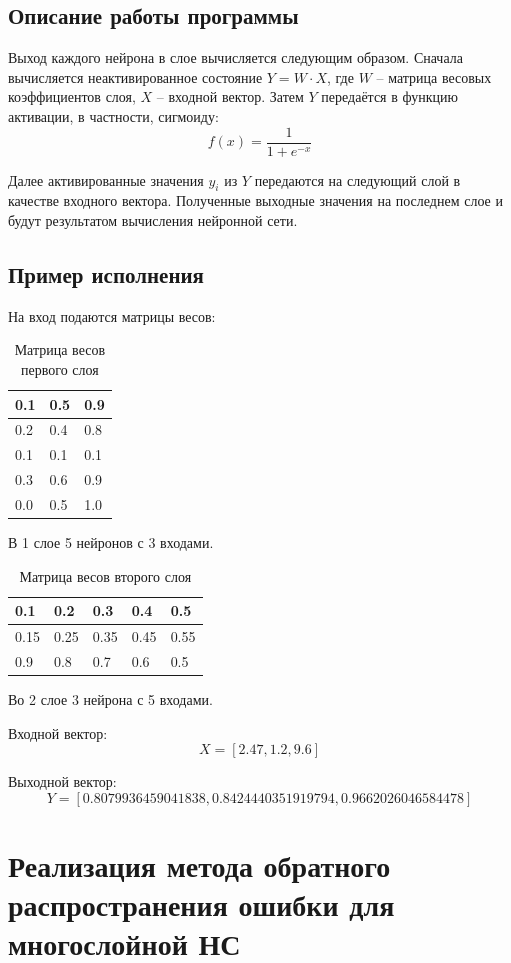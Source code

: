 \documentclass[bachelor, och, pract_otchet]{SCWorks}
\begin{document}
\subsection{Описание работы программы}
Выход каждого нейрона в слое вычисляется следующим образом.
Сначала вычисляется неактивированное состояние $Y = W \cdot X$, где
$W$ -- матрица весовых коэффициентов слоя,
$X$ -- входной вектор. Затем $Y$ передаётся в функцию активации,
в частности, сигмоиду:
\[ f(x) = \displaystyle\frac{1}{1 + e^{-x}} \]

Далее активированные значения $y_i$ из $Y$ передаются на следующий
слой в качестве входного вектора. Полученные выходные значения
на последнем слое и будут результатом вычисления нейронной сети.

\subsection{Пример исполнения}
На вход подаются матрицы весов:
\begin{table}[H]
  \begin{tabular}{|l|l|l|}
  \hline
  0.1 & 0.5 & 0.9 \\ \hline
  0.2 & 0.4 & 0.8 \\ \hline
  0.1 & 0.1 & 0.1 \\ \hline
  0.3 & 0.6 & 0.9 \\ \hline
  0.0 & 0.5 & 1.0 \\ \hline
  \end{tabular}
  \caption{Матрица весов первого слоя}
\end{table}
В 1 слое 5 нейронов с 3 входами.

\begin{table}[H]
  \begin{tabular}{|l|l|l|l|l|}
  \hline
  0.1 & 0.2 & 0.3 & 0.4 & 0.5 \\ \hline
  0.15 & 0.25 & 0.35 & 0.45 & 0.55 \\ \hline
  0.9 & 0.8 & 0.7 & 0.6 & 0.5 \\ \hline
  \end{tabular}
  \caption{Матрица весов второго слоя}
\end{table}
Во 2 слое 3 нейрона с 5 входами. 

Входной вектор:
\[ X = [2.47, 1.2, 9.6] \]

Выходной вектор:
\[ Y = [0.8079936459041838, 0.8424440351919794, 0.9662026046584478] \]

\section{Реализация метода обратного распространения ошибки для многослойной НС}
\end{document}
